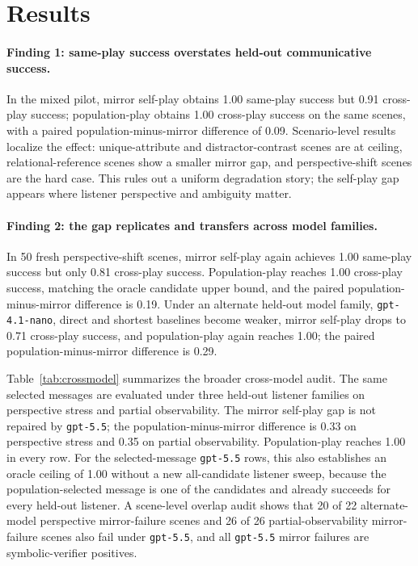 \section{Results}

\paragraph{Finding 1: same-play success overstates held-out communicative success.}
In the mixed pilot, mirror self-play obtains 1.00 same-play success but 0.91 cross-play success; population-play obtains 1.00 cross-play success on the same scenes, with a paired population-minus-mirror difference of 0.09. Scenario-level results localize the effect: unique-attribute and distractor-contrast scenes are at ceiling, relational-reference scenes show a smaller mirror gap, and perspective-shift scenes are the hard case. This rules out a uniform degradation story; the self-play gap appears where listener perspective and ambiguity matter.

\paragraph{Finding 2: the gap replicates and transfers across model families.}
In 50 fresh perspective-shift scenes, mirror self-play again achieves 1.00 same-play success but only 0.81 cross-play success. Population-play reaches 1.00 cross-play success, matching the oracle candidate upper bound, and the paired population-minus-mirror difference is 0.19. Under an alternate held-out model family, \texttt{gpt-4.1-nano}, direct and shortest baselines become weaker, mirror self-play drops to 0.71 cross-play success, and population-play again reaches 1.00; the paired population-minus-mirror difference is 0.29.

Table~\ref{tab:crossmodel} summarizes the broader cross-model audit. The same selected messages are evaluated under three held-out listener families on perspective stress and partial observability. The mirror self-play gap is not repaired by \texttt{gpt-5.5}; the population-minus-mirror difference is 0.33 on perspective stress and 0.35 on partial observability. Population-play reaches 1.00 in every row. For the selected-message \texttt{gpt-5.5} rows, this also establishes an oracle ceiling of 1.00 without a new all-candidate listener sweep, because the population-selected message is one of the candidates and already succeeds for every held-out listener. A scene-level overlap audit shows that 20 of 22 alternate-model perspective mirror-failure scenes and 26 of 26 partial-observability mirror-failure scenes also fail under \texttt{gpt-5.5}, and all \texttt{gpt-5.5} mirror failures are symbolic-verifier positives.

